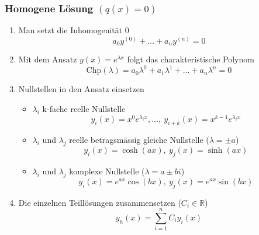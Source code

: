 \documentclass[a4paper, fontsize = 8pt, landscape]{scrartcl}
\begin{document}
\begin{multicols*}{3}
    \subsubsection{Homogene Lösung $(q(x)=0)$}
    \begin{enumerate}
        \item Man setzt die Inhomogenität 0
              \begin{equation*}
                  a_0y^{(0)}+\dots+ a_ny^{(n)}=0
              \end{equation*}
        \item Mit dem Ansatz $y(x)=e^{\lambda x}$ folgt das charakteristische Polynom
              \begin{equation*}
                  \text{Chp}(\lambda)=a_0\lambda^0+a_1\lambda^1+\dots +a_n\lambda^n=0
              \end{equation*}
        \item Nullstellen in den Ansatz einsetzen
              \begin{itemize}
                  \item $\lambda_i$  k-fache reelle Nullstelle
                        \begin{equation*}
                            y_i(x)=x^0e^{\lambda_i x}, \dots,~ y_{i+k}(x)=x^{k-1}e^{\lambda_i x}
                        \end{equation*}
                  \item $\lambda_i$ und $\lambda_j$ reelle betragsmässig gleiche Nullstelle ($\lambda = \pm a$)
                        \begin{equation*}
                            y_{i}(x) = \cosh(ax), ~y_j(x)=\sinh(ax)
                        \end{equation*}
                  \item $\lambda_i$ und $\lambda_j$ komplexe Nullstelle ($\lambda = a \pm bi$)
                        \begin{equation*}
                            y_{i}(x)=e^{ax}\cos(bx), ~y_j(x)=e^{ax}\sin(bx)
                        \end{equation*}
              \end{itemize}
        \item Die einzelnen Teillösungen zusammensetzen ($C_i \in \mathbb{R}$)
              \begin{equation*}
                  y_h(x)=\sum_{i=1}^{n}C_i y_i(x)
              \end{equation*}
    \end{enumerate}

\end{multicols*}
\end{document}
